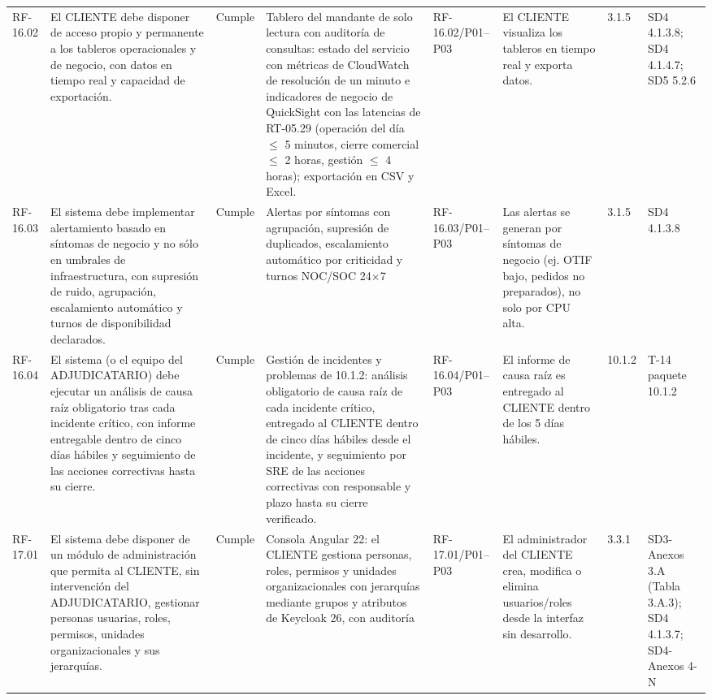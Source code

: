 \documentclass[oficio,firma,final]{lafrox}
\begin{document}
\begin{landscape}
{\begin{longtable}{@{}F{0.054} F{0.173} F{0.061} F{0.191} F{0.106} F{0.180} F{0.067} F{0.168}@{}}
  RF-16.02 & El CLIENTE debe disponer de acceso propio y permanente a los tableros operacionales y de negocio, con datos en tiempo real y capacidad de exportación. & Cumple & Tablero del mandante de solo lectura con auditoría de consultas: estado del servicio con métricas de CloudWatch de resolución de un minuto e indicadores de negocio de QuickSight con las latencias de RT-05.29 (operación del día $\leq$ 5 minutos, cierre comercial $\leq$ 2 horas, gestión $\leq$ 4 horas); exportación en CSV y Excel. & RF-16.02/\allowbreak{}P01--\allowbreak{}P03 & El CLIENTE visualiza los tableros en tiempo real y exporta datos. & 3.1.5 & SD4 4.1.3.8; SD4 4.1.4.7; SD5 5.2.6  \\
  RF-16.03 & El sistema debe implementar alertamiento basado en síntomas de negocio y no sólo en umbrales de infraestructura, con supresión de ruido, agrupación, escalamiento automático y turnos de disponibilidad declarados. & Cumple & Alertas por síntomas con agrupación, supresión de duplicados, escalamiento automático por criticidad y turnos NOC/SOC 24$\times$7 & RF-16.03/\allowbreak{}P01--\allowbreak{}P03 & Las alertas se generan por síntomas de negocio (ej. OTIF bajo, pedidos no preparados), no solo por CPU alta. & 3.1.5 & SD4 4.1.3.8  \\
  RF-16.04 & El sistema (o el equipo del ADJUDICATARIO) debe ejecutar un análisis de causa raíz obligatorio tras cada incidente crítico, con informe entregable dentro de cinco días hábiles y seguimiento de las acciones correctivas hasta su cierre. & Cumple & Gestión de incidentes y problemas de 10.1.2: análisis obligatorio de causa raíz de cada incidente crítico, entregado al CLIENTE dentro de cinco días hábiles desde el incidente, y seguimiento por SRE de las acciones correctivas con responsable y plazo hasta su cierre verificado. & RF-16.04/\allowbreak{}P01--\allowbreak{}P03 & El informe de causa raíz es entregado al CLIENTE dentro de los 5 días hábiles. & 10.1.2 & T-14 paquete 10.1.2  \\
  RF-17.01 & El sistema debe disponer de un módulo de administración que permita al CLIENTE, sin intervención del ADJUDICATARIO, gestionar personas usuarias, roles, permisos, unidades organizacionales y sus jerarquías. & Cumple & Consola Angular 22: el CLIENTE gestiona personas, roles, permisos y unidades organizacionales con jerarquías mediante grupos y atributos de Keycloak 26, con auditoría & RF-17.01/\allowbreak{}P01--\allowbreak{}P03 & El administrador del CLIENTE crea, modifica o elimina usuarios/roles desde la interfaz sin desarrollo. & 3.3.1 & SD3-Anexos 3.A (Tabla 3.A.3); SD4 4.1.3.7; SD4-Anexos 4-N  \\

\end{longtable}}
\end{landscape}
\end{document}
